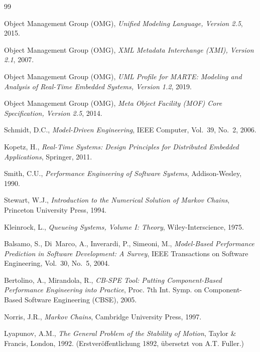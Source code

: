 ﻿\documentclass[a4paper,12pt]{scrreprt}
\theoremstyle{definition}
\begin{document}
\begin{thebibliography}{99}
	
	Object Management Group (OMG),
	\textit{Unified Modeling Language, Version 2.5},
	2015.
	
	Object Management Group (OMG),
	\textit{XML Metadata Interchange (XMI), Version 2.1},
	2007.
	
	Object Management Group (OMG),
	\textit{UML Profile for MARTE: Modeling and Analysis of Real-Time
		Embedded Systems, Version 1.2},
	2019.
	
	Object Management Group (OMG),
	\textit{Meta Object Facility (MOF) Core Specification, Version 2.5},
	2014.
	
	Schmidt, D.C.,
	\textit{Model-Driven Engineering},
	IEEE Computer, Vol.~39, No.~2, 2006.
	
	Kopetz, H.,
	\textit{Real-Time Systems: Design Principles for Distributed
		Embedded Applications},
	Springer, 2011.
	
	Smith, C.U.,
	\textit{Performance Engineering of Software Systems},
	Addison-Wesley, 1990.
	
	Stewart, W.J.,
	\textit{Introduction to the Numerical Solution of Markov Chains},
	Princeton University Press, 1994.
	
	Kleinrock, L.,
	\textit{Queueing Systems, Volume I: Theory},
	Wiley-Interscience, 1975.
	
	Balsamo, S., Di~Marco, A., Inverardi, P., Simeoni, M.,
	\textit{Model-Based Performance Prediction in Software Development:
		A Survey},
	IEEE Transactions on Software Engineering, Vol.~30, No.~5, 2004.
	
	Bertolino, A., Mirandola, R.,
	\textit{CB-SPE Tool: Putting Component-Based Performance Engineering
		into Practice},
	Proc. 7th Int. Symp. on Component-Based Software Engineering
	(CBSE), 2005.
	
	Norris, J.R.,
	\textit{Markov Chains},
	Cambridge University Press, 1997.
	
	Lyapunov, A.M.,
	\textit{The General Problem of the Stability of Motion},
	Taylor \& Francis, London, 1992.
	(Erstveröffentlichung 1892, übersetzt von A.T. Fuller.)
	

\end{thebibliography}
\end{document}
